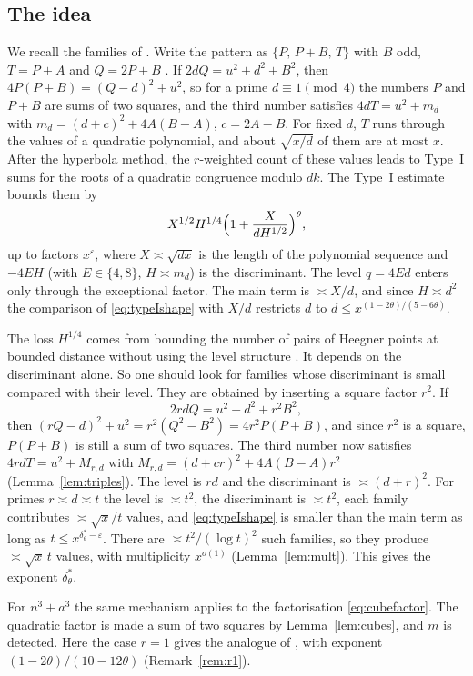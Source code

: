 \documentclass[11pt]{amsart}
\theoremstyle{remark}
\theoremstyle{definition}
\numberwithin{equation}{section}
\newcommand{\eps}{\varepsilon}
\begin{document}
\subsection{The idea}\label{sec:idea}
We recall the families of \cite{IC}. Write the pattern as $\{P,\,P+B,\,T\}$ with $B$ odd, $T=P+A$ and $Q=2P+B$ \cite[Lemma~2.3]{IC}. If $2dQ=u^2+d^2+B^2$, then $4P(P+B)=(Q-d)^2+u^2$, so for a prime $d\equiv1\pmod4$ the numbers $P$ and $P+B$ are sums of two squares, and the third number satisfies $4dT=u^2+m_d$ with $m_d=(d+c)^2+4A(B-A)$, $c=2A-B$. For fixed $d$, $T$ runs through the values of a quadratic polynomial, and about $\sqrt{x/d}$ of them are at most $x$. After the hyperbola method, the $r$-weighted count of these values leads to Type~I sums for the roots of a quadratic congruence modulo $dk$. The Type~I estimate \cite[Theorem~6.1]{IC} bounds them by
\begin{equation}\label{eq:typeIshape}
X^{1/2}H^{1/4}\Bigl(1+\frac X{dH^{1/2}}\Bigr)^{\theta},
\end{equation}
up to factors $x^{\eps}$, where $X\asymp\sqrt{dx}$ is the length of the polynomial sequence and $-4EH$ (with $E\in\{4,8\}$, $H\asymp m_d$) is the discriminant. The level $q=4Ed$ enters only through the exceptional factor. The main term is $\asymp X/d$, and since $H\asymp d^2$ the comparison of \eqref{eq:typeIshape} with $X/d$ restricts $d$ to $d\le x^{(1-2\theta)/(5-6\theta)}$.

The loss $H^{1/4}$ comes from bounding the number of pairs of Heegner points at bounded distance without using the level structure \cite[Remark~13.1]{IC}. It depends on the discriminant alone. So one should look for families whose discriminant is small compared with their level. They are obtained by inserting a square factor $r^2$. If
\[
2rdQ=u^2+d^2+r^2B^2,
\]
then $(rQ-d)^2+u^2=r^2(Q^2-B^2)=4r^2P(P+B)$, and since $r^2$ is a square, $P(P+B)$ is still a sum of two squares. The third number now satisfies $4rdT=u^2+M_{r,d}$ with $M_{r,d}=(d+cr)^2+4A(B-A)r^2$ (Lemma~\ref{lem:triples}). The level is $rd$ and the discriminant is $\asymp(d+r)^2$. For primes $r\asymp d\asymp t$ the level is $\asymp t^2$, the discriminant is $\asymp t^2$, each family contributes $\asymp\sqrt x/t$ values, and \eqref{eq:typeIshape} is smaller than the main term as long as $t\le x^{\delta^*_\theta-\eps}$. There are $\asymp t^2/(\log t)^2$ such families, so they produce $\asymp\sqrt x\,t$ values, with multiplicity $x^{o(1)}$ (Lemma~\ref{lem:mult}). This gives the exponent $\delta^*_\theta$.

For $n^3+a^3$ the same mechanism applies to the factorisation \eqref{eq:cubefactor}. The quadratic factor is made a sum of two squares by Lemma~\ref{lem:cubes}, and $m$ is detected. Here the case $r=1$ gives the analogue of \cite{IC}, with exponent $(1-2\theta)/(10-12\theta)$ (Remark~\ref{rem:r1}).
\end{document}
